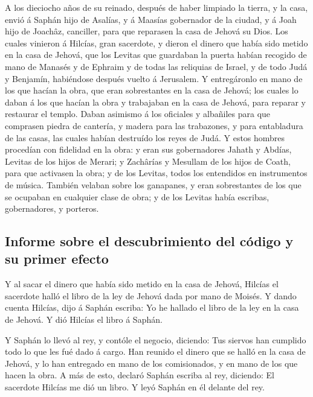  A los dieciocho años de su reinado, después de haber
limpiado la tierra, y la casa, envió á Saphán hijo de Asalías, y á
Maasías gobernador de la ciudad, y á Joah hijo de Joachâz, canciller,
para que reparasen la casa de Jehová su Dios.  Los cuales
vinieron á Hilcías, gran sacerdote, y dieron el dinero que había sido
metido en la casa de Jehová, que los Levitas que guardaban la puerta
habían recogido de mano de Manasés y de Ephraim y de todas las reliquias
de Israel, y de todo Judá y Benjamín, habiéndose después vuelto á
Jerusalem.  Y entregáronlo en mano de los que hacían la
obra, que eran sobrestantes en la casa de Jehová; los cuales lo daban á
los que hacían la obra y trabajaban en la casa de Jehová, para reparar y
restaurar el templo.  Daban asimismo á los oficiales y
albañiles para que comprasen piedra de cantería, y madera para las
trabazones, y para entabladura de las casas, las cuales habían destruído
los reyes de Judá.  Y estos hombres procedían con fidelidad
en la obra: y eran sus gobernadores Jahath y Abdías, Levitas de los
hijos de Merari; y Zachârías y Mesullam de los hijos de Coath, para que
activasen la obra; y de los Levitas, todos los entendidos en
instrumentos de música.  También velaban sobre los
ganapanes, y eran sobrestantes de los que se ocupaban en cualquier clase
de obra; y de los Levitas había escribas, gobernadores, y porteros.

\hypertarget{informe-sobre-el-descubrimiento-del-cuxf3digo-y-su-primer-efecto}{%
\subsection{Informe sobre el descubrimiento del código y su primer
efecto}\label{informe-sobre-el-descubrimiento-del-cuxf3digo-y-su-primer-efecto}}

 Y al sacar el dinero que había sido metido en la casa de
Jehová, Hilcías el sacerdote halló el libro de la ley de Jehová dada por
mano de Moisés.  Y dando cuenta Hilcías, dijo á Saphán
escriba: Yo he hallado el libro de la ley en la casa de Jehová. Y dió
Hilcías el libro á Saphán.

 Y Saphán lo llevó al rey, y contóle el negocio, diciendo:
Tus siervos han cumplido todo lo que les fué dado á cargo. 
Han reunido el dinero que se halló en la casa de Jehová, y lo han
entregado en mano de los comisionados, y en mano de los que hacen la
obra.  A más de esto, declaró Saphán escriba al rey,
diciendo: El sacerdote Hilcías me dió un libro. Y leyó Saphán en él
delante del rey.

